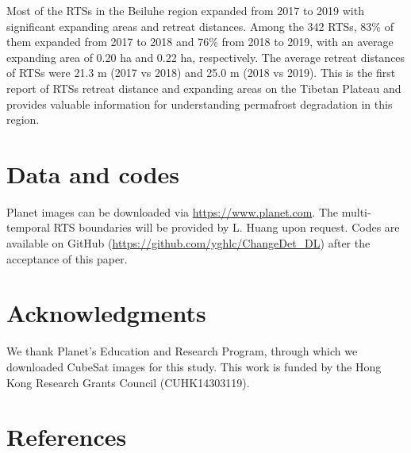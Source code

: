 \documentclass[authoryear,preprint,review,12pt]{elsarticle}
\begin{document}
Most of the RTSs in the Beiluhe region expanded from 2017 to 2019 with significant expanding areas and retreat distances. 
Among the 342 RTSs, 83\% of them expanded from 2017 to 2018 and 76\% from 2018 to 2019, with an average expanding area of 0.20 ha and 0.22 ha, respectively.
The average retreat distances of RTSs were 21.3 m (2017 vs 2018) and 25.0 m (2018 vs 2019).
This is the first report of RTSs retreat distance and expanding areas on the Tibetan Plateau and provides valuable information for understanding permafrost degradation in this region. 


\section{Data and codes}
\label{sec_data_codes}

Planet images can be downloaded via \url{https://www.planet.com}. 
The multi-temporal RTS boundaries will be provided by L. Huang upon request. 
Codes are available on GitHub (\url{https://github.com/yghlc/ChangeDet_DL}) after the acceptance of this paper.

\section{Acknowledgments}
\label{sec_acknowledgments}


We thank Planet's Education and Research Program, through which we downloaded CubeSat images for this study. 
This work is funded by the Hong Kong Research Grants Council (CUHK14303119).




\section{References}
\label{sec_reference}

 
%



%
%
\end{document}
